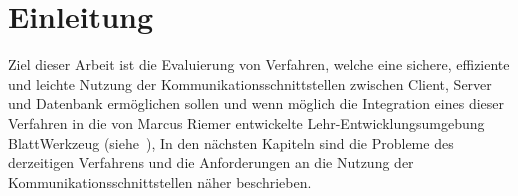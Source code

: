 
\chapter{Einleitung}
\label{sec:introduction}

Ziel dieser Arbeit ist die Evaluierung von Verfahren, welche eine sichere, effiziente und leichte Nutzung der Kommunikationsschnittstellen
zwischen Client, Server und Datenbank ermöglichen sollen und wenn möglich die Integration eines dieser Verfahren
in die von Marcus Riemer entwickelte Lehr-Entwicklungsumgebung BlattWerkzeug (siehe~),
In den nächsten Kapiteln sind die Probleme des derzeitigen Verfahrens und die Anforderungen an die Nutzung der Kommunikationsschnittstellen näher beschrieben.


